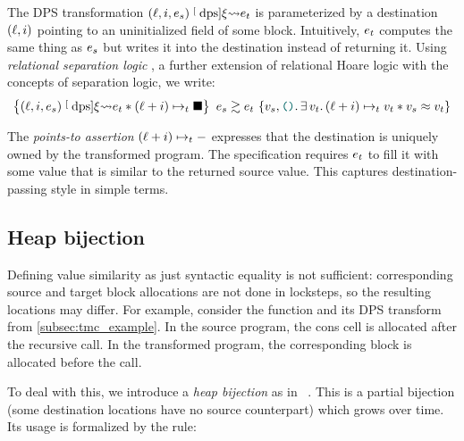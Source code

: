 The DPS transformation $(\datalangLoc, \datalangIdx, \datalangExpr_s) \tmcDps{\datalangRenaming} \datalangExpr_t$ is parameterized by a destination $(\datalangLoc, \datalangIdx)$ pointing to an uninitialized field of some block.
Intuitively, $\datalangExpr_t$ computes the same thing as $\datalangExpr_s$ but writes it into the destination instead of returning it.
Using \emph{relational separation logic} , a further extension of relational Hoare logic with the concepts of separation logic, we write:
\[
    \iSimvHoare{
        (\datalangLoc, \datalangIdx, \datalangExpr_s) \tmcDps{\datalangRenaming} \datalangExpr_t \iSep
        (\datalangLoc + \datalangIdx) \iPointsto_t \datalangHole
    }{
        \datalangVal_s, \datalangUnit \ldotp
        \exists \datalangVal_t \ldotp
        (\datalangLoc + \datalangIdx) \iPointsto_t \datalangVal_t \iSep
        \datalangVal_s \iSimilar \datalangVal_t
    }{
        \datalangExpr_s
    }{
        \datalangExpr_t
    }
\]

The \emph{points-to assertion} $(\datalangLoc + \datalangIdx) \iPointsto_t -$ expresses that the destination is uniquely owned by the transformed program.
The specification requires $\datalangExpr_t$ to fill it with some value that is similar to the returned source value.
This captures destination-passing style in simple terms.

\subsection{Heap bijection}

Defining value similarity as just syntactic equality is not sufficient: corresponding source and target block allocations are not done in locksteps, so the resulting locations may differ.
For example, consider the  function and its DPS transform from \cref{subsec:tmc_example}.
In the source program, the cons cell  is allocated after the recursive call.
In the transformed program, the corresponding block is allocated before the call.

To deal with this, we introduce a \emph{heap bijection} as in \Simuliris~\citep*{simuliris-2022}.
This is a partial bijection (some destination locations have no source counterpart) which grows over time.
Its usage is formalized by the  rule:

